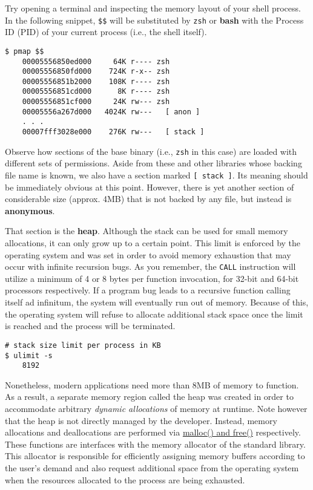 Try opening a terminal and inspecting the memory layout of your shell process.
In the following snippet, \texttt{\$\$} will be substituted by \texttt{zsh} or
\textbf{bash} with the Process ID (PID) of your current process (i.e., the shell
itself).

\begin{lstlisting}[style=bashstyle]
$ pmap $$
    00005556850ed000     64K r---- zsh
    00005556850fd000    724K r-x-- zsh
    00005556851b2000    108K r---- zsh
    00005556851cd000      8K r---- zsh
    00005556851cf000     24K rw--- zsh
    00005556a267d000   4024K rw---   [ anon ]
    . . .
    00007fff3028e000    276K rw---   [ stack ]
\end{lstlisting}

Observe how sections of the base binary (i.e., \texttt{zsh} in this case) are
loaded with different sets of permissions. Aside from these and other libraries
whose backing file name is known, we also have a section marked
\texttt{[ stack ]}. Its meaning should be immediately obvious at this point.
However, there is yet another section of considerable size (approx. 4MB) that
is not backed by any file, but instead is \textbf{anonymous}.

That section is the \textbf{heap}. Although the stack can be used for small
memory allocations, it can only grow up to a certain point. This limit is
enforced by the operating system and was set in order to avoid memory
exhaustion that may occur with infinite recursion bugs. As you remember, the
\texttt{CALL} instruction will utilize a minimum of 4 or 8 bytes per function
invocation, for 32-bit and 64-bit processors respectively. If a program bug
leads to a recursive function calling itself ad infinitum, the system will
eventually run out of memory. Because of this, the operating system will refuse
to allocate additional stack space once the limit is reached and the process
will be terminated.

\begin{lstlisting}[style=bashstyle]
# stack size limit per process in KB
$ ulimit -s
    8192
\end{lstlisting}

Nonetheless, modern applications need more than 8MB of memory to function. As
a result, a separate memory region called the heap was created in order to
accommodate arbitrary \textit{dynamic allocations} of memory at runtime. Note
however that the heap is not directly managed by the developer. Instead,
memory allocations and deallocations are performed via
\href{https://man7.org/linux/man-pages/man3/malloc.3.html}{malloc() and free()}
respectively. These functions are interfaces with the memory allocator of the
standard library. This allocator is responsible for efficiently assigning
memory buffers according to the user's demand and also request additional space
from the operating system when the resources allocated to the process are
being exhausted.

